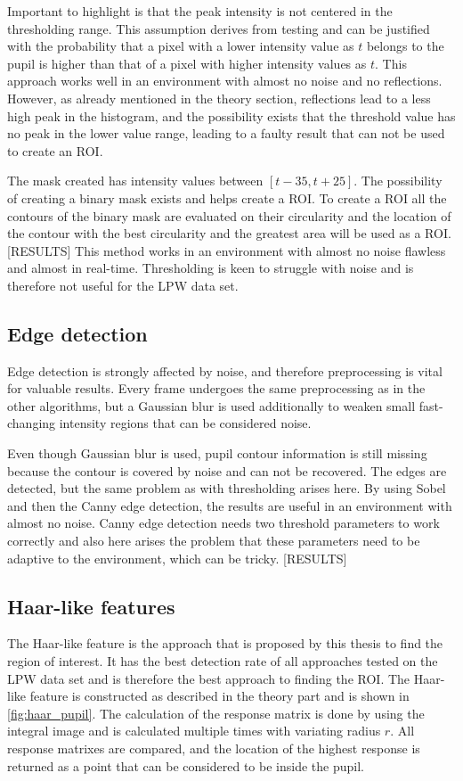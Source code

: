 Important to highlight is that the peak intensity is not centered in the thresholding range. This assumption derives from testing and can be justified with the probability that a pixel with a lower intensity value as $t$ belongs to the pupil is higher than that of a pixel with higher intensity values as $t$. This approach works well in an environment with almost no noise and no reflections. However, as already mentioned in the theory section, reflections lead to a less high peak in the histogram, and the possibility exists that the threshold value has no peak in the lower value range, leading to a faulty result that can not be used to create an ROI.

The mask created has intensity values between $[t-35, t+25]$. The possibility of creating a binary mask exists and helps create a ROI. To create a ROI all the contours of the binary mask are evaluated on their circularity and the location of the contour with the best circularity and the greatest area will be used as a ROI.
[RESULTS]
This method works in an environment with almost no noise flawless and almost in real-time. Thresholding is keen to struggle with noise and is therefore not useful for the LPW data set.
\subsection{Edge detection}
Edge detection is strongly affected by noise, and therefore preprocessing is vital for valuable results. Every frame undergoes the same preprocessing as in the other algorithms, but a Gaussian blur is used additionally to weaken small fast-changing intensity regions that can be considered noise.

Even though Gaussian blur is used, pupil contour information is still missing because the contour is covered by noise and can not be recovered. The edges are detected, but the same problem as with thresholding arises here. By using Sobel and then the Canny edge detection, the results are useful in an environment with almost no noise. Canny edge detection needs two threshold parameters to work correctly and also here arises the problem that these parameters need to be adaptive to the environment, which can be tricky. 
[RESULTS]

\subsection{Haar-like features}
The Haar-like feature is the approach that is proposed by this thesis to find the region of interest. It has the best detection rate of all approaches tested on the LPW data set and is therefore the best approach to finding the ROI. The Haar-like feature is constructed as described in the theory part and is shown in \ref{fig:haar_pupil}. 
The calculation of the response matrix is done by using the integral image and is calculated multiple times with variating radius $r$. All response matrixes are compared, and the location of the highest response is returned as a point that can be considered to be inside the pupil. 

